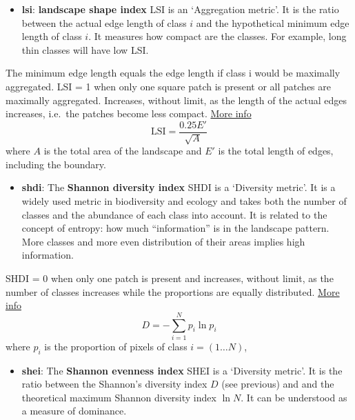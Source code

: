 \documentclass[
  letterpaper,
  DIV=11,
  numbers=noendperiod]{scrartcl}
\providecommand{\tightlist}{%
  \setlength{\itemsep}{0pt}\setlength{\parskip}{0pt}}\usepackage{longtable,booktabs,array}
\begin{document}
\begin{itemize}
\tightlist
\item
  \textbf{lsi}: \textbf{landscape shape index} LSI is an `Aggregation
  metric'. It is the ratio between the actual edge length of class \(i\)
  and the hypothetical minimum edge length of class \(i\). It measures
  how compact are the classes. For example, long thin classes will have
  low LSI.
\end{itemize}

The minimum edge length equals the edge length if class i would be
maximally aggregated. LSI = 1 when only one square patch is present or
all patches are maximally aggregated. Increases, without limit, as the
length of the actual edges increases, i.e.~the patches become less
compact.
\href{https://r-spatialecology.github.io/landscapemetrics/reference/lsm_c_lsi.html?q=lsi}{More
info} \[   \mathrm{LSI} = \frac{0.25 E'}{\sqrt{A}}\] where \(A\) is the
total area of the landscape and \(E'\) is the total length of edges,
including the boundary.

\begin{itemize}
\tightlist
\item
  \textbf{shdi}: The \textbf{Shannon diversity index} SHDI is a
  `Diversity metric'. It is a widely used metric in biodiversity and
  ecology and takes both the number of classes and the abundance of each
  class into account. It is related to the concept of entropy: how much
  ``information'' is in the landscape pattern. More classes and more
  even distribution of their areas implies high information.
\end{itemize}

SHDI = 0 when only one patch is present and increases, without limit, as
the number of classes increases while the proportions are equally
distributed.
\href{https://r-spatialecology.github.io/landscapemetrics/reference/lsm_l_shdi.html?q=shd}{More
info} \[ D = - \sum_{i=1}^N p_i \ln p_i\] where \(p_i\) is the
proportion of pixels of class \(i = (1 \ldots N)\),

\begin{itemize}
\tightlist
\item
  \textbf{shei}: The \textbf{Shannon evenness index} SHEI is a
  `Diversity metric'. It is the ratio between the Shannon's diversity
  index \(D\) (see previous) and and the theoretical maximum Shannon
  diversity index \(\ln N\). It can be understood as a measure of
  dominance.
\end{itemize}
\end{document}
